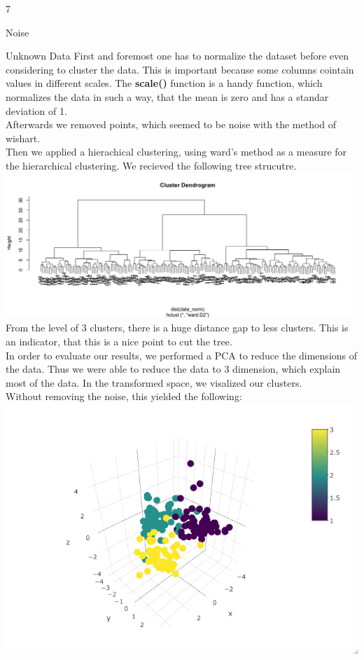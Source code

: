 \documentclass{article}
\begin{document}
\begin{ukon-infie}[12.12.17]{7}
\begin{exercise}[p=3]{Noise}
			
		\end{exercise}
		
		\begin{exercise}[p=7]{Unknown Data}
			First and foremost one has to normalize the dataset before even considering to cluster the data. This is important because some columns cointain values in different scales. The \textbf{scale()} function is a handy function, which normalizes the data in such a way, that the mean is zero and has a standar deviation of 1.\\
			Afterwards we removed points, which seemed to be noise with the method of wishart.\\
			Then we applied a hierachical clustering, using ward's method as a measure for the hierarchical clustering. We recieved the following tree strucutre.\\
			\includegraphics[scale=0.4]{hclust_tree.png}\\
			From the level of 3 clusters, there is a huge distance gap to less clusters. This is an indicator, that this is a nice point to cut the tree.\\
			In order to evaluate our results, we performed a PCA to reduce the dimensions of the data. Thus we were able to reduce the data to 3 dimension, which explain most of the data. In the transformed space, we visalized our clusters.\\
			Without removing the noise, this yielded the following:\\
			\includegraphics[scale=0.6]{pca_cluster_with_noise.png}\\

\end{exercise}
\end{ukon-infie}
\end{document}
